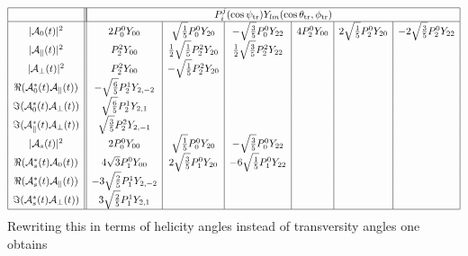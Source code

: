 \documentclass[a4paper,10pt,twosided]{article}
\def\thetatr{\theta_\mathrm{tr}}
\def\phitr{\phi_\mathrm{tr}}
\def\psitr{\psi_\mathrm{tr}}
\begin{document}
\begin{equation}\label{tab:pdfinpy}
\begin{array}{|c|| c | c | c | c | c | c |}
 \hline
&\multicolumn{6}{|c|}{ P_i^j(\cos\psitr)Y_{lm}(\cos\thetatr,\phitr) } \\
 \hline
|{\cal A}_0(t)|^2                       &  2 P_0^0Y_{00}  & \sqrt{\frac{1}{5}} P_0^0 Y_{20} & - \sqrt{\frac{3}{5}} P_0^0 Y_{22}
                                        &  4 P_2^0Y_{00}  & 2 \sqrt{\frac{1}{5}} P_2^0 Y_{20} & -2 \sqrt{\frac{3}{5}} P_2^0 Y_{22} \\
|{\cal A}_\parallel(t)|^2               &    P_2^2Y_{00} &  \frac{1}{2}\sqrt{\frac{1}{5}} P_2^2 Y_{20} & \frac{1}{2}\sqrt{\frac{3}{5}} P_2^2Y_{22} & && \\
|{\cal A}_\perp(t)|^2                   &  P_2^2 Y_{00} & -\sqrt{\frac{1}{5}} P_2^2 Y_{20} &                                 &&& \\
\Re({\cal A}_0^*(t){\cal A}_\parallel(t))     & -\sqrt{\frac{6}{5}} P_2^1 Y_{2,-2} &&&&&\\
\Im({\cal A}_0^*(t){\cal A}_\perp(t))         &  \sqrt{\frac{6}{5}} P_2^1 Y_{2,1} &&&&&\\
\Im({\cal A}_\parallel^*(t){\cal A}_\perp(t)) &  \sqrt{\frac{3}{5}} P_2^2 Y_{2,-1} &&&&&\\
|{\cal A}_{s}(t)|^2                   &  2 P_0^0 Y_{00} & \sqrt{\frac{1}{5}} P_0^0 Y_{20} & -\sqrt{\frac{3}{5}} P_0^0 Y_{22}                                &&& \\
\Re({\cal A}_{s}^*(t){\cal A}_0(t))   &  4 \sqrt{3} P_1^0 Y_{00} & 2 \sqrt{\frac{3}{5}} P_1^0 Y_{20} & - 6 \sqrt{\frac{1}{5}} P_1^0 Y_{22}                       &&& \\
\Re({\cal A}_{s}^*(t){\cal A}_\parallel(t))   &  -3\sqrt{\frac{2}{5}} P_1^1 Y_{2,-2} &&&&& \\
\Im({\cal A}_{s}^*(t){\cal A}_\perp(t))     &  3\sqrt{\frac{2}{5}} P_1^1 Y_{2,1} &&&&& \\
 \hline
\end{array}
\end{equation}
Rewriting this in terms of helicity angles instead of transversity angles one obtains
\end{document}
